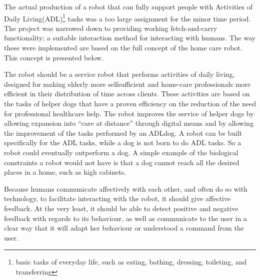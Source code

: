 \documentclass[project_eva.tex]{subfiles}
\begin{document}
The actual production of a robot that can fully support people with Activities of Daily Living(ADL)\footnote{basic tasks of everyday life, such as eating, bathing, dressing, toileting, and transferring}  tasks was a too large assignment for the minor time period. The project was narrowed down to providing working fetch-and-carry functionality; a suitable interaction method for interacting with humans. The way these were implemented are based on the full concept of the home care robot. This concept is presented below.

The robot should be a service robot that performs activities of daily living, designed for making elderly more selfsufficient\cite{Forlizzi} and home-care professionals more efficient in their distribution of time across clients. These 
activities are based on the tasks of helper dogs that have a proven efficiency on the reduction of the need for 
professional healthcare help\cite{Diepenhorst}. The robot improves the service of helper dogs by allowing 
expansion into ``care at distance'' \cite{Evers} through digital means and by allowing the improvement of the tasks 
performed by an ADLdog. A robot can be built specifically for the ADL tasks, while a dog is not born to do ADL tasks. So a robot could eventually outperform a dog.  A simple example of the biological constraints a robot would not have is that a dog cannot reach all the desired places in a home, such as high cabinets.

Because humans communicate affectively with each other, and often do so with technology, to facilitate interacting with the robot, it should give affective feedback. At the very least, it should be able to detect positive and negative feedback with regards to its behaviour, as well as communicate to the user in a clear way that it will adapt her behaviour or understood a command from the user.
\end{document}
